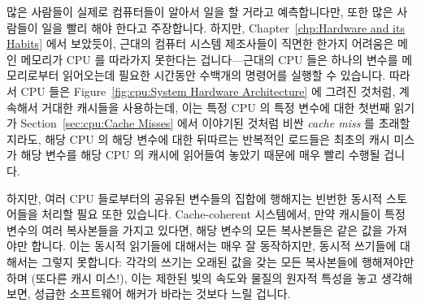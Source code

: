 많은 사람들이 실제로 컴퓨터들이 알아서 일을 할 거라고 예측합니다만, 또한 많은
사람들이 일을 빨리 해야 한다고 주장합니다.
하지만, Chapter~\ref{chp:Hardware and its Habits} 에서 보았듯이, 근대의 컴퓨터
시스템 제조사들이 직면한 한가지 어려움은 메인 메모리가 CPU 를 따라가지 못한다는
겁니다---근대의 CPU 들은 하나의 변수를 메모리로부터 읽어오는데 필요한 시간동안
수백개의 명령어를 실행할 수 있습니다.
따라서 CPU 들은 Figure~\ref{fig:cpu:System Hardware Architecture}
에 그려진 것처럼, 계속해서 거대한 캐시들을 사용하는데, 이는 특정 CPU 의 특정
변수에 대한 첫번째 읽기가 Section~\ref{sec:cpu:Cache Misses} 에서 이야기된
것처럼 비싼 \emph{cache miss} 를 초래할지라도, 해당 CPU 의 해당 변수에 대한
뒤따르는 반복적인 로드들은 최초의 캐시 미스가 해당 변수를 해당 CPU 의 캐시에
읽어들여 놓았기 때문에 매우 빨리 수행될 겁니다.

하지만, 여러 CPU 들로부터의 공유된 변수들의 집합에 행해지는 빈번한 동시적
스토어들을 처리할 필요 또한 있습니다.
Cache-coherent 시스템에서, 만약 캐시들이 특정 변수의 여러 복사본들을 가지고
있다면, 해당 변수의 모든 복사본들은 같은 값을 가져야만 합니다.
이는 동시적 읽기들에 대해서는 매우 잘 동작하지만, 동시적 쓰기들에 대해서는
그렇지 못합니다: 각각의 쓰기는 오래된 값을 갖는 모든 복사본들에 행해져야만 하며
(또다른 캐시 미스!), 이는 제한된 빛의 속도와 물질의 원자적 특성을 놓고 생각해
보면, 성급한 소프트웨어 해커가 바라는 것보다 느릴 겁니다.
\iffalse

